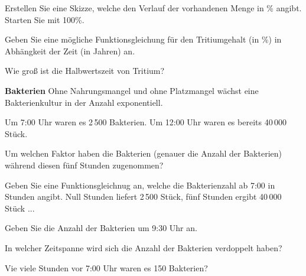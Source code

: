 \begin{bbwAufgabenBlock}
\item Erstellen Sie eine Skizze, welche den Verlauf der vorhandenen
  Menge in \% angibt. Starten Sie mit 100\%.


\item Geben Sie eine mögliche Funktionsgleichung für den Tritiumgehalt
  (in \%)
  in Abhängkeit der Zeit (in Jahren) an.

  
\item  
  Wie groß ist die Halbwertszeit von Tritium?

\end{bbwAufgabenBlock}
\platzFuerBerechnungenBisEndeSeite{}


\bbwActAufgabenNr{} \textbf{Bakterien}
 Ohne Nahrungsmangel und ohne Platzmangel wächst eine Bakterienkultur
 in der Anzahl exponentiell.

Um 7:00 Uhr waren es 2\,500 Bakterien.
Um 12:00 Uhr waren es bereits 40\,000 Stück.

\begin{bbwAufgabenBlock}

\item Um welchen Faktor haben die Bakterien (genauer die Anzahl der Bakterien) während diesen fünf
Stunden zugenommen?


\item Geben Sie eine Funktionsgleichnug an, welche die Bakterienzahl ab
7:00 in Stunden angibt. Null Stunden liefert 2\,500 Stück, fünf
      Stunden ergibt 40\,000 Stück ...

\item Geben Sie die Anzahl der Bakterien um 9:30 Uhr an.

\item In welcher Zeitspanne wird sich die Anzahl der Bakterien
verdoppelt haben?

\item Vie viele Stunden vor 7:00 Uhr waren es 150 Bakterien?


\end{bbwAufgabenBlock}
\platzFuerBerechnungenBisEndeSeite{}

